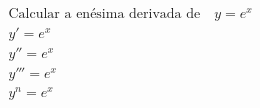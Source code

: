 \begin{ex}
\begin{align}
&\text{Calcular a enésima derivada de}\quad y=e^{x}\nonumber\\
&y'=e^{x}\nonumber\\
&y''=e^{x}\nonumber\\
&y'''=e^{x}\nonumber\\
&y^{n}=e^{x}\nonumber
\end{align}
\end{ex}
